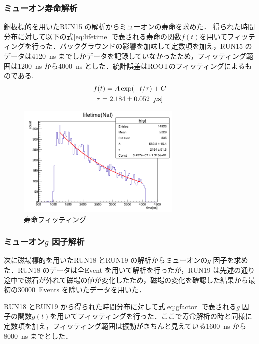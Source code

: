 
\subsubsection{ミューオン寿命解析}
銅板標的を用いたRUN15 の解析からミューオンの寿命を求めた．
得られた時間分布に対して以下の式\eqref{eq:lifetime} で表される寿命の関数$f(t)$を用いてフィッティングを行った．バックグラウンドの影響を加味して定数項を加え，RUN15 のデータは4120~ns までしかデータを記録していなかったため，フィッティング範囲は1200~ns から4000~ns とした．統計誤差はROOTのフィッティングによるものである.
\begin{gather}
f(t) = A\exp(-t / \tau)+C \label{eq:lifetime}\\
\tau = 2.184 \pm 0.052~[\mu \mathrm{s}] \notag
\end{gather}
\begin{figure}[H]
\centering
\includegraphics[width  = 0.7\textwidth]{figure/mino/lifetime_NaI_ratio.png}
\caption{寿命フィッティング}
\end{figure}


\subsubsection{ミューオン$g$ 因子解析}

次に磁場標的を用いたRUN18 とRUN19 の解析からミューオンの$g$ 因子を求めた．RUN18 のデータは全Event を用いて解析を行ったが，RUN19 は先述の通り途中で磁石が外れて磁場の値が変化したため，磁場の変化を確認した結果から最初の30000~Events を除いたデータを用いた．

RUN18 とRUN19 から得られた時間分布に対して式\eqref{eq:gfactor} で表される$g$ 因子の関数$g(t)$を用いてフィッティングを行った．ここで寿命解析の時と同様に定数項を加え，フィッティング範囲は振動がきちんと見えている1600~ns から8000~ns までとした．

